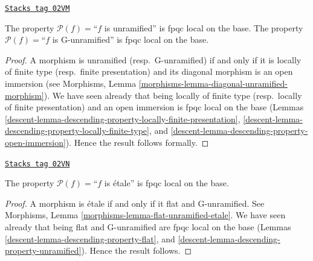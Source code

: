 \begin{lemma}
\label{descent-lemma-descending-property-unramified}
\href{https://stacks.math.columbia.edu/tag/02VM}{\texttt{Stacks tag 02VM}}

The property $\mathcal{P}(f) =$``$f$ is unramified''
is fpqc local on the base.
The property $\mathcal{P}(f) =$``$f$ is G-unramified''
is fpqc local on the base.
\end{lemma}

\begin{proof}

A morphism is unramified (resp.\ G-unramified) if and only if it is
locally of finite type (resp.\ finite presentation)
and its diagonal morphism is an open immersion (see
Morphisms, Lemma \ref{morphisms-lemma-diagonal-unramified-morphism}).
We have seen already that being locally of finite type
(resp.\ locally of finite presentation) and an open immersion is
fpqc local on the base (Lemmas
\ref{descent-lemma-descending-property-locally-finite-presentation},
\ref{descent-lemma-descending-property-locally-finite-type}, and
\ref{descent-lemma-descending-property-open-immersion}).
Hence the result follows formally.
\end{proof}

\begin{lemma}
\label{descent-lemma-descending-property-etale}
\href{https://stacks.math.columbia.edu/tag/02VN}{\texttt{Stacks tag 02VN}}

The property $\mathcal{P}(f) =$``$f$ is \'etale''
is fpqc local on the base.
\end{lemma}

\begin{proof}

A morphism is \'etale if and only if it flat and G-unramified.
See Morphisms, Lemma \ref{morphisms-lemma-flat-unramified-etale}.
We have seen already that being flat and G-unramified
are fpqc local on the base (Lemmas
\ref{descent-lemma-descending-property-flat}, and
\ref{descent-lemma-descending-property-unramified}).
Hence the result follows.
\end{proof}

